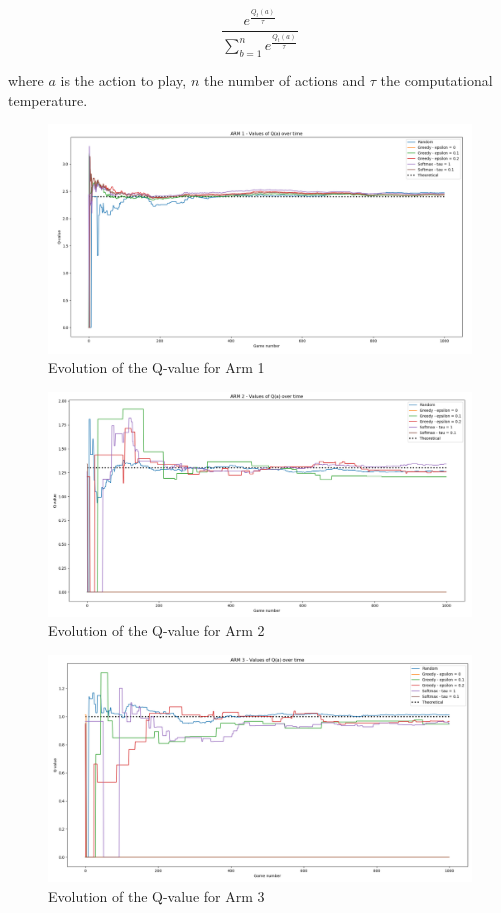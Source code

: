 \documentclass{article}
\begin{document}
$$ \frac{e^{\frac{Q_{t}(a)}{\tau}}}{\sum_{b=1}^{n} e^{\frac{Q_{t}(a)}{\tau}}} $$    

where $a$ is the action to play, $n$ the number of actions and $\tau$ the computational temperature. 


\begin{figure}[H]
  \centering
  \includegraphics[scale=0.35]{fig/bandit-arm1.png}
  \caption{Evolution of the Q-value for Arm 1}
  \label{fig:bandit-arm1}
\end{figure}

\begin{figure}[H]
  \centering
  \includegraphics[scale=0.35]{fig/bandit-arm2.png}
  \caption{Evolution of the Q-value for Arm 2}
  \label{fig:bandit-arm2}
\end{figure}

\begin{figure}[H]
  \centering
  \includegraphics[scale=0.35]{fig/bandit-arm3.png}
  \caption{Evolution of the Q-value for Arm 3}
  \label{fig:bandit-arm3}
\end{figure}
\end{document}
